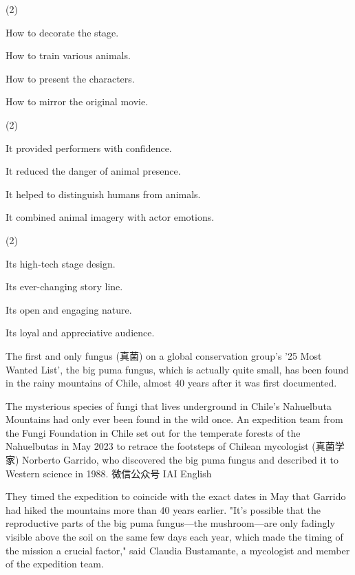 \documentclass{英语试卷}
\begin{document}
\begin{choices}(2)
  \item How to decorate the stage.
  \item How to train various animals.
  \item How to present the characters.
  \item How to mirror the original movie.
\end{choices}
\begin{choices}(2)
  \item It provided performers with confidence.
  \item It reduced the danger of animal presence.
  \item It helped to distinguish humans from animals.
  \item It combined animal imagery with actor emotions.
\end{choices}
\begin{choices}(2)
  \item Its high-tech stage design.
  \item Its ever-changing story line.
  \item Its open and engaging nature.
  \item Its loyal and appreciative audience.
\end{choices}
\par The first and only fungus (真菌) on a global conservation group's '25 Most Wanted List', the big puma fungus, which is actually quite small, has been found in the rainy mountains of Chile, almost 40 years after it was first documented.\par
\par The mysterious species of fungi that lives underground in Chile's Nahuelbuta Mountains had only ever been found in the wild once. An expedition team from the Fungi Foundation in Chile set out for the temperate forests of the Nahuelbutas in May 2023 to retrace the footsteps of Chilean mycologist (真菌学家) Norberto Garrido, who discovered the big puma fungus and described it to Western science in 1988. 微信公众号 IAI English\par
\par They timed the expedition to coincide with the exact dates in May that Garrido had hiked the mountains more than 40 years earlier. "It's possible that the reproductive parts of the big puma fungus—the mushroom—are only fadingly visible above the soil on the same few days each year, which made the timing of the mission a crucial factor," said Claudia Bustamante, a mycologist and member of the expedition team.\par
\end{document}
